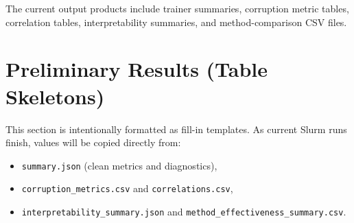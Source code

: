 \documentclass[10pt]{article}
\begin{document}
The current output products include trainer summaries, corruption metric tables, correlation tables, interpretability summaries, and method-comparison CSV files.



\section{Preliminary Results (Table Skeletons)}
This section is intentionally formatted as fill-in templates. As current Slurm runs finish, values will be copied directly from:
\begin{itemize}[leftmargin=*]
\item \texttt{summary.json} (clean metrics and diagnostics),
\item \texttt{corruption\_metrics.csv} and \texttt{correlations.csv},
\item \texttt{interpretability\_summary.json} and \texttt{method\_effectiveness\_summary.csv}.
\end{itemize}
\end{document}
